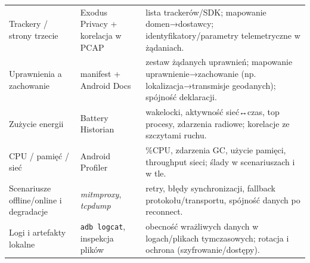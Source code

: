 \begin{longtable}{@{}p{}p{}p{}@{}}
Trackery / strony trzecie &
Exodus Privacy + korelacja w PCAP \cite{ExodusPrivacy} &
lista trackerów/SDK; mapowanie domen→dostawcy; identyfikatory/parametry telemetryczne w żądaniach. \\[2pt]

Uprawnienia a zachowanie &
manifest + Android Docs \cite{AndroidPermissionsOverview} &
zestaw żądanych uprawnień; mapowanie uprawnienie→zachowanie (np. lokalizacja→transmisje geodanych); spójność deklaracji. \\[2pt]

Zużycie energii &
Battery Historian \cite{BatteryHistorian} &
wakelocki, aktywność sieć↔czas, top procesy, zdarzenia radiowe; korelacje ze szczytami ruchu. \\[2pt]

CPU / pamięć / sieć &
Android Profiler \cite{AndroidProfiler} &
\%CPU, zdarzenia GC, użycie pamięci, throughput sieci; ślady w scenariuszach i w tle. \\[2pt]

Scenariusze offline/online i degradacje &
\textit{mitmproxy}, \textit{tcpdump} \cite{MitmproxyDocs,tcpdump} &
retry, błędy synchronizacji, fallback protokołu/transportu, spójność danych po reconnect. \\[2pt]

Logi i artefakty lokalne &
\texttt{adb logcat}, inspekcja plików &
obecność wrażliwych danych w logach/plikach tymczasowych; rotacja i ochrona (szyfrowanie/dostępy). \\
\end{longtable}
\endgroup
